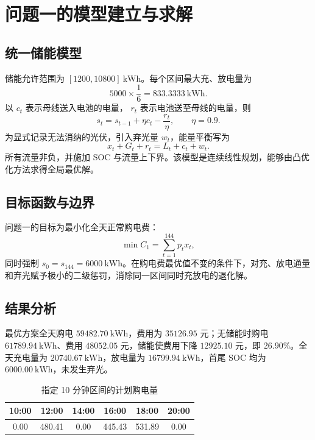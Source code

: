 \section{问题一的模型建立与求解}

\subsection{统一储能模型}

储能允许范围为 $[1200,10800]~\mathrm{kWh}$。每个区间最大充、放电量为
\[
5000\times\frac{1}{6}=833.3333~\mathrm{kWh}.
\]
以 $c_t$ 表示母线送入电池的电量，
$r_t$ 表示电池送至母线的电量，则
\begin{equation}
s_t=s_{t-1}+\eta c_t-\frac{r_t}{\eta},\qquad \eta=0.9.
\label{eq:soc}
\end{equation}
为显式记录无法消纳的光伏，引入弃光量 $w_t$，能量平衡写为
\begin{equation}
x_t+G_t+r_t=L_t+c_t+w_t.
\label{eq:balance}
\end{equation}
所有流量非负，并施加 SOC 与流量上下界。该模型是连续线性规划，能够由凸优化方法求得全局最优解\cite{boyd2004}。

\subsection{目标函数与边界}

问题一的目标为最小化全天正常购电费：
\begin{equation}
\min C_1=\sum_{t=1}^{144}p_t x_t,
\end{equation}
同时强制 $s_0=s_{144}=6000~\mathrm{kWh}$。在购电费最优值不变的条件下，对充、放电通量和弃光赋予极小的二级惩罚，消除同一区间同时充放电的退化解。

\subsection{结果分析}

最优方案全天购电 $59482.70~\mathrm{kWh}$，费用为 $35126.95$ 元；无储能时购电
$61789.94~\mathrm{kWh}$、费用 $48052.05$ 元，储能使费用下降 $12925.10$ 元，即
$26.90\%$。全天充电量为 $20740.67~\mathrm{kWh}$，放电量为
$16799.94~\mathrm{kWh}$，首尾 SOC 均为 $6000.00~\mathrm{kWh}$，未发生弃光。

\begin{table}[H]
\centering
\caption{指定 10 分钟区间的计划购电量}
\begin{tabular}{cccccc}
\toprule
10:00 & 12:00 & 14:00 & 16:00 & 18:00 & 20:00 \\
\midrule
0.00 & 480.41 & 0.00 & 445.43 & 531.89 & 0.00 \\
\bottomrule
\end{tabular}
\end{table}

